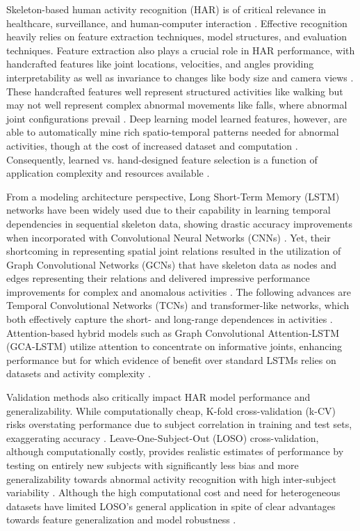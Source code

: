 \documentclass{iopconfser}
\begin{document}
Skeleton-based human activity recognition (HAR) is of critical relevance in healthcare, surveillance, and human-computer interaction \cite{liu2018skeleton}. Effective recognition heavily relies on feature extraction techniques, model structures, and evaluation techniques. Feature extraction also plays a crucial role in HAR performance, with handcrafted features like joint locations, velocities, and angles providing interpretability as well as invariance to changes like body size and camera views \cite{ramirez2022human,yan2018spatial}. These handcrafted features well represent structured activities like walking but may not well represent complex abnormal movements like falls, where abnormal joint configurations prevail \cite{liu2018skeleton}. Deep learning model learned features, however, are able to automatically mine rich spatio-temporal patterns needed for abnormal activities, though at the cost of increased dataset and computation \cite{li2017skeleton}. Consequently, learned vs. hand-designed feature selection is a function of application complexity and resources available \cite{yan2018spatial}.

From a modeling architecture perspective, Long Short-Term Memory (LSTM) networks have been widely used due to their capability in learning temporal dependencies in sequential skeleton data, showing drastic accuracy improvements when incorporated with Convolutional Neural Networks (CNNs) \cite{lee2017ensemble,li2019temporal}. Yet, their shortcoming in representing spatial joint relations resulted in the utilization of Graph Convolutional Networks (GCNs) that have skeleton data as nodes and edges representing their relations and delivered impressive performance improvements for complex and anomalous activities \cite{yan2018spatial}. The following advances are Temporal Convolutional Networks (TCNs) and transformer-like networks, which both effectively capture the short- and long-range dependences in activities \cite{li2019temporal,plizzari2020skeleton}. Attention-based hybrid models such as Graph Convolutional Attention-LSTM (GCA-LSTM) utilize attention to concentrate on informative joints, enhancing performance but for which evidence of benefit over standard LSTMs relies on datasets and activity complexity \cite{yan2018spatial,lee2017ensemble}.

Validation methods also critically impact HAR model performance and generalizability. While computationally cheap, K-fold cross-validation (k-CV) risks overstating performance due to subject correlation in training and test sets, exaggerating accuracy \cite{hammerla2015let,braganca2022validation}. Leave-One-Subject-Out (LOSO) cross-validation, although computationally costly, provides realistic estimates of performance by testing on entirely new subjects with significantly less bias and more generalizability towards abnormal activity recognition with high inter-subject variability \cite{gholamiangonabadi2020deep,braganca2022validation}. Although the high computational cost and need for heterogeneous datasets have limited LOSO's general application in spite of clear advantages towards feature generalization and model robustness \cite{braganca2022validation}.
\end{document}
